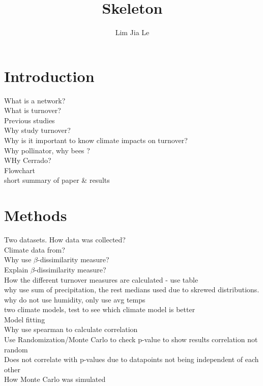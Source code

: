 \documentclass[11pt]{article}
\title{\textbf{\LARGE{Skeleton}}}
\date{}
\author{%
\large{Lim Jia Le}
}
\makeatletter
\renewcommand{\maketitle}{\bgroup\setlength{\parindent}{0pt}
\begin{flushleft}
  \textbf{\@title} %

  \@author
\end{flushleft}\egroup
}
\makeatother
\begin{document}
\maketitle
\smallskip
\tableofcontents


\section{Introduction} %
What is a network? \\
What is turnover? \\
Previous studies \\
Why study turnover? \\
Why is it important to know climate impacts on turnover? \\
Why pollinator, why bees ? \\
WHy Cerrado? \\
Flowchart \\
short summary of paper \& results \\

\section{Methods} %
Two datasets. How data was collected?\\
Climate data from? \\
Why use $\beta$-dissimilarity measure? \\
Explain $\beta$-dissimilarity measure? \\
How the different turnover measures are calculated - use table \\
why use sum of precipitation, the rest medians used due to skrewed distributions. \\
why do not use humidity, only use avg temps \\
two climate models, test to see which climate model is better \\
Model fitting\\
Why use spearman to calculate correlation \\
Use Randomization/Monte Carlo to check p-value to show results correlation not random \\
Does not correlate with p-values due to datapoints not being independent of each other\\
How Monte Carlo was simulated \\
\end{document}
